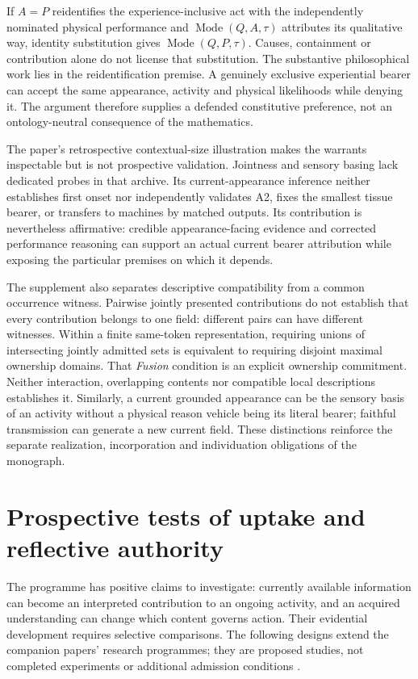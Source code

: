 If $A=P$ reidentifies the experience-inclusive act with the independently nominated physical performance and $\operatorname{Mode}(Q,A,\tau)$ attributes its qualitative way, identity substitution gives $\operatorname{Mode}(Q,P,\tau)$. Causes, containment or contribution alone do not license that substitution. The substantive philosophical work lies in the reidentification premise. A genuinely exclusive experiential bearer can accept the same appearance, activity and physical likelihoods while denying it. The argument therefore supplies a defended constitutive preference, not an ontology-neutral consequence of the mathematics.

The paper's retrospective contextual-size illustration makes the warrants inspectable but is not prospective validation. Jointness and sensory basing lack dedicated probes in that archive. Its current-appearance inference neither establishes first onset nor independently validates A2, fixes the smallest tissue bearer, or transfers to machines by matched outputs. Its contribution is nevertheless affirmative: credible appearance-facing evidence and corrected performance reasoning can support an actual current bearer attribution while exposing the particular premises on which it depends.


The supplement also separates descriptive compatibility from a common occurrence witness. Pairwise jointly presented contributions do not establish that every contribution belongs to one field: different pairs can have different witnesses. Within a finite same-token representation, requiring unions of intersecting jointly admitted sets is equivalent to requiring disjoint maximal ownership domains. That \emph{Fusion} condition is an explicit ownership commitment. Neither interaction, overlapping contents nor compatible local descriptions establishes it. Similarly, a current grounded appearance can be the sensory basis of an activity without a physical reason vehicle being its literal bearer; faithful transmission can generate a new current field. These distinctions reinforce the separate realization, incorporation and individuation obligations of the monograph.

\section{Prospective tests of uptake and reflective authority}
\label{sec:prospective-enactment-tests}
The programme has positive claims to investigate: currently available information can become an interpreted contribution to an ongoing activity, and an acquired understanding can change which content governs action. Their evidential development requires selective comparisons. The following designs extend the companion papers' research programmes; they are proposed studies, not completed experiments or additional admission conditions \cite{RodgersWholeField2026,RodgersRelationalAwareness2026,RodgersReflectiveAlignment,RodgersConstitutedAgency}.

